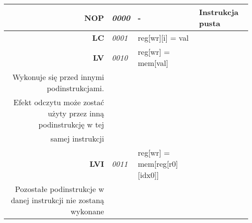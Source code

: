 \begin{landscape}
\begin{longtable}[c]{|r|l|l|l|}
\endhead
%
\textbf{NOP}                              & \textit{0000}                     & -                                                                                                                                           & Instrukcja pusta                                                                                                                                                                                                                                                                                                                                                               \\ \hline
\textbf{LC}                               & \textit{0001}                     & reg{[}wr{]}{[}i{]} = val                                                                                                                    &                                                                                                                                                                                                                                                                                                                                                                                \\ \hline
\textbf{LV}                               & \textit{0010}                     & reg{[}wr{]} = mem{[}val{]}                                                                                                                  & \begin{tabular}[c]{@{}l@{}}$\mathtt{i\in\left\lbrace 2, 3 \right\rbrace }$\\ Wykonuje się przed innymi podinstrukcjami. \\ Efekt odczytu może zostać użyty przez inną podinstrukcję w tej\\ samej instrukcji\end{tabular}                                                                                                                                                      \\ \hline
\textbf{LVI}                              & \textit{0011}                     & reg{[}wr{]} = mem{[}reg{[}r0{]}{[}idx0{]}{]}                                                                                                & \begin{tabular}[c]{@{}l@{}}$\mathtt{i=3}$\\ Pozostałe podinstrukcje w danej instrukcji nie zostaną wykonane\end{tabular}                                                                                                                                                                                                                                                       \\ \hline

\end{longtable}
\end{landscape}
